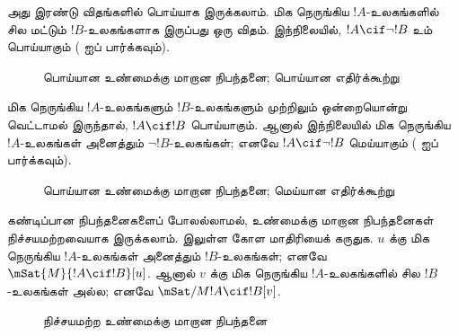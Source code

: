 \documentclass[../../../include/open-logic-section]{subfiles}
\begin{document}
அது இரண்டு விதங்களில் பொய்யாக இருக்கலாம். மிக நெருங்கிய $!A$-உலகங்களில்
சில மட்டும் $!B$-உலகங்களாக இருப்பது ஒரு விதம். இந்நிலையில், $!A \cif
\lnot !B$ உம் பொய்யாகும்
( ஐப் பார்க்கவும்).
\begin{figure}
\begin{center}
\caption{பொய்யான உண்மைக்கு மாறான நிபந்தனை; பொய்யான எதிர்க்கூற்று}
\end{center}
\end{figure}
மிக நெருங்கிய $!A$-உலகங்களும் $!B$-உலகங்களும் முற்றிலும் ஒன்றையொன்று
வெட்டாமல் இருந்தால், $!A \cif !B$ பொய்யாகும். ஆனால் இந்நிலையில் மிக
நெருங்கிய $!A$-உலகங்கள் அனைத்தும் $\lnot !B$-உலகங்கள்; எனவே $!A \cif
\lnot !B$ மெய்யாகும் ( ஐப் பார்க்கவும்).
\begin{figure}
\begin{center}
\caption{பொய்யான உண்மைக்கு மாறான நிபந்தனை; மெய்யான எதிர்க்கூற்று}
\end{center}
\end{figure}

கண்டிப்பான நிபந்தனைகளைப் போலல்லாமல், உண்மைக்கு மாறான நிபந்தனைகள்
நிச்சயமற்றவையாக இருக்கலாம்.  இலுள்ள கோள மாதிரியைக்
கருதுக. $u$ க்கு மிக நெருங்கிய $!A$-உலகங்கள் அனைத்தும் $!B$-உலகங்கள்;
எனவே $\mSat{M}{!A \cif !B}[u]$. ஆனால் $v$ க்கு மிக நெருங்கிய
$!A$-உலகங்களில் சில $!B$-உலகங்கள் அல்ல; எனவே $\mSat/{M}{!A \cif
!B}[v]$.
\begin{figure}
\begin{center}
\end{center}
\caption{நிச்சயமற்ற உண்மைக்கு மாறான நிபந்தனை}
\end{figure}
\end{document}

